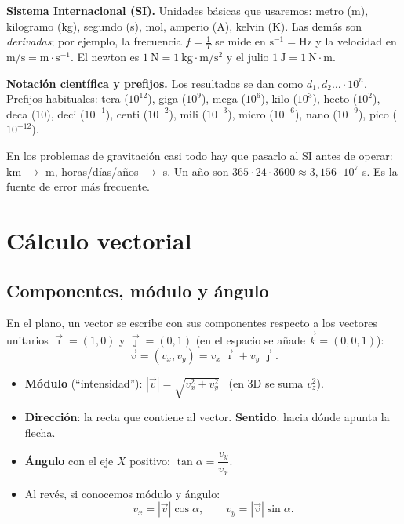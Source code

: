 \documentclass[11pt,a4paper]{article}
\newcommand{\ii}{\vec{\imath}}
\newcommand{\jj}{\vec{\jmath}}
\newcommand{\kk}{\vec{k}}
\begin{document}
\textbf{Sistema Internacional (SI).} Unidades básicas que usaremos: metro (m), kilogramo (kg), segundo (s), mol, amperio (A), kelvin (K). Las demás son \emph{derivadas}; por ejemplo, la frecuencia $f=\frac1T$ se mide en $\mathrm{s^{-1}}=\mathrm{Hz}$ y la velocidad en $\mathrm{m/s}=\mathrm{m\cdot s^{-1}}$. El newton es $1\ \mathrm{N}=1\ \mathrm{kg\cdot m/s^2}$ y el julio $1\ \mathrm J=1\ \mathrm{N\cdot m}$.

\textbf{Notación científica y prefijos.} Los resultados se dan como $d_1{,}d_2\ldots\cdot10^{n}$. Prefijos habituales: tera ($10^{12}$), giga ($10^9$), mega ($10^6$), kilo ($10^3$), hecto ($10^2$), deca ($10$), deci ($10^{-1}$), centi ($10^{-2}$), mili ($10^{-3}$), micro ($10^{-6}$), nano ($10^{-9}$), pico ($10^{-12}$).

\begin{ojo}
En los problemas de gravitación casi todo hay que pasarlo al SI antes de operar: km $\to$ m, horas/días/años $\to$ s. Un año son $365\cdot24\cdot3600\approx3{,}156\cdot10^7$ s. Es la fuente de error más frecuente.
\end{ojo}

\section{Cálculo vectorial}
\subsection{Componentes, módulo y ángulo}
En el plano, un vector se escribe con sus componentes respecto a los vectores unitarios $\ii=(1,0)$ y $\jj=(0,1)$ (en el espacio se añade $\kk=(0,0,1)$):
\[
\vec v=(v_x,v_y)=v_x\,\ii+v_y\,\jj .
\]
\begin{minipage}{0.55\textwidth}
\begin{itemize}[itemsep=2pt]
  \item \textbf{Módulo} (``intensidad''): $|\vec v|=\sqrt{v_x^2+v_y^2}$ \ (en 3D se suma $v_z^2$).
  \item \textbf{Dirección}: la recta que contiene al vector. \textbf{Sentido}: hacia dónde apunta la flecha.
  \item \textbf{Ángulo} con el eje $X$ positivo: $\tan\alpha=\dfrac{v_y}{v_x}$.
  \item Al revés, si conocemos módulo y ángulo:
  \[ v_x=|\vec v|\cos\alpha,\qquad v_y=|\vec v|\sin\alpha. \]
\end{itemize}
\end{minipage}\hfill
\begin{minipage}{0.4\textwidth}
\end{minipage}
\end{document}
